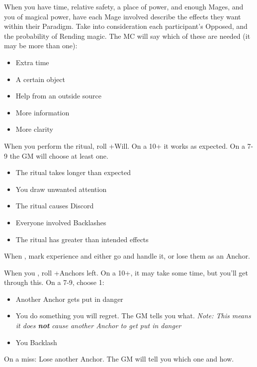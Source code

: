 \begin{multicols}{3}
\begin{move}
  \end{move}

  \columnbreak
  
  \begin{move}
    When you have time, relative safety, a place of power, and enough
    Mages, and you  of magical power, have
    each Mage involved describe the effects they want within their Paradigm.
    Take into consideration each participant's Opposed, and the
    probability of Rending magic. The MC will say which of these are
    needed (it may be more than one):
    \begin{itemize}
      \setlength\itemsep{0em}
    \item Extra time
    \item A certain object
    \item Help from an outside source
    \item More information
    \item More clarity
    \end{itemize}
    When you perform the ritual, roll +Will. On a 10+ it works as
    expected. On a 7-9 the GM will choose at least one.
    \begin{itemize}
      \setlength\itemsep{0em}
    \item The ritual takes longer than expected
    \item You draw unwanted attention
    \item The ritual causes Discord
    \item Everyone involved Backlashes
    \item The ritual has greater than intended effects
    \end{itemize}
  \end{move}

  \SEPARATOR

  \begin{move}
    When , mark
    experience and either go and handle it, or lose them as an
    Anchor.
  \end{move}

  \SEPARATOR

  \begin{move}
    When you , roll +Anchors left. On a 10+,
    it may take some time, but you'll get through this. On a 7-9,
    choose 1:
    \begin{itemize}
      \setlength\itemsep{0em}
    \item Another Anchor gets put in danger
    \item You do something you will regret. The GM tells you
      what. \textit{Note: This means it does \textbf{not} cause
        another Anchor to get put in danger}
      \item You Backlash
    \end{itemize}
    On a miss: Lose another Anchor. The GM will tell you which one and
    how.
  \end{move}


\end{multicols}

